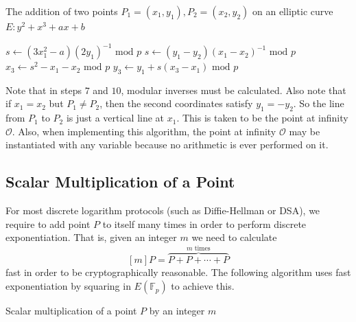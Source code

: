 \begin{algorithm} \label{ellipticlaw}
	\caption{The addition of two points $P_1 = (x_1,y_1),P_2 = (x_2,y_2)$ on an elliptic curve $E : y^2 + x^3 + ax + b$}
	\begin{algorithmic}[1]
				\State {}
				\State {}
				\State $ s \leftarrow (3x_1^2 - a)(2y_1)^{-1} \text { mod } p $
		  	\Else
	  				\State $ s \leftarrow (y_1 - y_2)(x_1 - x_2)^{-1} \text{ mod }p $
	  			\Else
	  				\State {}
	  			\EndIf
	  		\EndIf 
	  		\State $ x_3 \leftarrow s^2 - x_1 -x_2 \text{ mod } p $
	  		\State $ y_3 \leftarrow  y_1 + s(x_3 - x_1) \text{ mod } p $ 
	  		\State {}
	  	\EndFunction
	\end{algorithmic} 
\end{algorithm} 

Note that in steps $7$ and $10$, modular inverses must be calculated. Also note that if $x_1 = x_2$ but $P_1 \neq P_2$, then the second coordinates satisfy $y_1 = -y_2$. So the line from $P_1$ to $P_2$ is just a vertical line at $x_1$. This is taken to be the point at infinity $\mathcal{O}$. Also, when implementing this algorithm, the point at infinity $\mathcal{O}$ may be instantiated with any variable because no arithmetic is ever performed on it. 

\subsection{Scalar Multiplication of a Point}

For most discrete logarithm protocols (such as Diffie-Hellman or DSA), we require to add point $P$ to itself many times in order to perform discrete exponentiation. That is, given an integer $m$ we need to calculate $$[m]P = \overbrace{P + P + \cdots + P}^{m \text{ times}}$$ fast in order to be cryptographically reasonable. The following algorithm uses fast exponentiation by squaring in $E(\mathbb{F}_p)$ to achieve this. 


\begin{algorithm} 
	\caption{Scalar multiplication of a point $P$ by an integer $m$}
	\begin{algorithmic}[1]
		  		\State {}
		  		\State {}
		  		\State {}
		  	\Else 
		  		\State {}
		  	\EndIf
	  	\EndFunction
	\end{algorithmic} 
\end{algorithm} 

